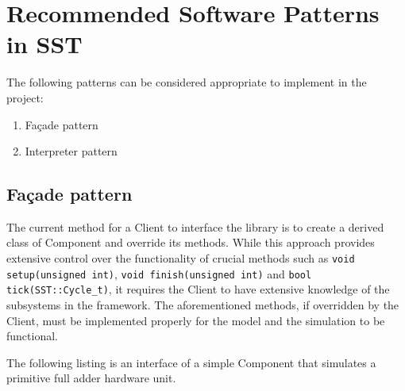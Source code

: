 \section{Recommended Software Patterns in SST}
The following patterns can be considered appropriate to implement in the project:
\begin{enumerate}
    \item Façade pattern
    \item Interpreter pattern
\end{enumerate}

\subsection{Façade pattern}
The current method for a Client to interface the library is to create a derived class of Component and override its methods. While this approach provides extensive control over the functionality of crucial methods such as \texttt{void setup(unsigned int)}, \texttt{void finish(unsigned int)} and \texttt{bool tick(SST::Cycle\_t)}, it requires the Client to have extensive knowledge of the subsystems in the framework. The aforementioned methods, if overridden by the Client, must be implemented properly for the model and the simulation to be functional.

The following listing is an interface of a simple Component that simulates a primitive full adder hardware unit.

